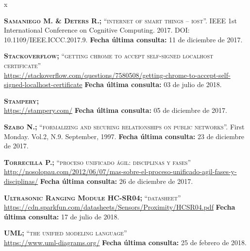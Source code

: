 \begin{thebibliography} {x}

	 \textsc{\textbf{Samaniego M. \& Deters R.; }} \textsc{“internet of smart things – iost”.} IEEE 1st International Conference on Cognitive Computing. 2017. DOI: 10.1109/IEEE.ICCC.2017.9.	
	\newline \textbf{Fecha última consulta:} 11 de diciembre de 2017.
	
	 \textsc{\textbf{Stackoverflow; }}\textsc{“getting chrome to accept self-signed localhost certificate”} \\ 
	\url{https://stackoverflow.com/questions/7580508/getting-chrome-to-accept-self-signed-localhost-certificate}
	\newline \textbf{Fecha última consulta:} 03 de julio de 2018.
		
	 \textsc{\textbf{Stampery; }} \\
	\url{https://stampery.com/}
	\newline \textbf{Fecha última consulta:} 05 de diciembre de 2017.
				
	 \textsc{\textbf{Szabo N.; }} \textsc{“formalizing and securing relationships on public networks”.} First Monday. Vol.2, N.9. September, 1997.	
	\newline \textbf{Fecha última consulta:} 23 de diciembre de 2017.
		
	 \textsc{\textbf{Torrecilla P.; }}\textsc{“proceso unificado ágil: disciplinas y fases”} \\ 
	\url{http://nosolopau.com/2012/06/07/mas-sobre-el-proceso-unificado-agil-fases-y-disciplinas/}
	\newline \textbf{Fecha última consulta:} 26 de diciembre de 2017.
		
	 \textsc{\textbf{Ultrasonic Ranging Module HC-SR04; }}\textsc{“datasheet”} \\
	\url{https://cdn.sparkfun.com/datasheets/Sensors/Proximity/HCSR04.pdf}
	\newline \textbf{Fecha última consulta:} 17 de julio de 2018.
				
	 \textsc{\textbf{UML; }}\textsc{“the unified modeling language”} \\ 
	\url{https://www.uml-diagrams.org/}
	\newline \textbf{Fecha última consulta:} 25 de febrero de 2018.	
		

\end{thebibliography}
